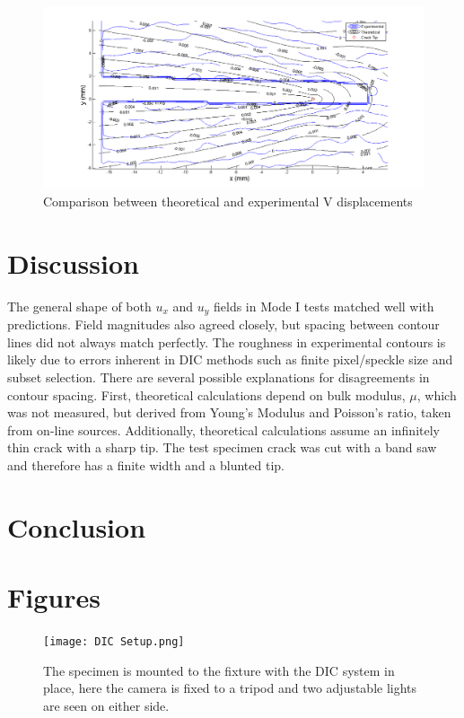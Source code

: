 \documentclass[12pt]{article}
\begin{document}
\begin{figure}[H]
	\centering
	\includegraphics[width=1\textwidth]{contourCompare_8_2.png}
	\caption{Comparison between theoretical and experimental V displacements}
	\label{fig:cc2}
\end{figure}


\section{Discussion}%
The general shape of both $u_x$ and $u_y$ fields in Mode I tests matched well with predictions. Field magnitudes also agreed closely, but spacing between contour lines did not always match perfectly. The roughness in experimental contours is likely due to errors inherent in DIC methods such as finite pixel/speckle size and subset selection. There are several possible explanations for disagreements in contour spacing. First, theoretical calculations depend on bulk modulus, $\mu$, which was not measured, but derived from Young's Modulus and Poisson's ratio, taken from on-line sources. Additionally, theoretical calculations assume an infinitely thin crack with a sharp tip. The test specimen crack was cut with a band saw and therefore has a finite width and a blunted tip. 
\section{Conclusion}%

\section{Figures}
\begin{figure}[H]
	\centering
	\texttt{[image: DIC Setup.png]}
	\caption{The specimen is mounted to the fixture with the DIC system in place, here the camera is fixed to a tripod and two adjustable lights are seen on either side.}
	\label{fig:DIC}
\end{figure}
\end{document}
